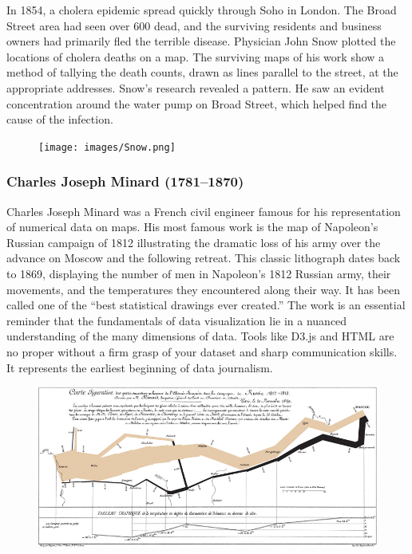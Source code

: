 \documentclass[]{book}
\begin{document}
In 1854, a cholera epidemic spread quickly through Soho in London. The
Broad Street area had seen over 600 dead, and the surviving residents
and business owners had primarily fled the terrible disease. Physician
John Snow plotted the locations of cholera deaths on a map. The
surviving maps of his work show a method of tallying the death counts,
drawn as lines parallel to the street, at the appropriate addresses.
Snow's research revealed a pattern. He saw an evident concentration
around the water pump on Broad Street, which helped find the cause of
the infection.

\begin{figure}
\centering
\texttt{[image: images/Snow.png]}
\caption{}
\end{figure}

\subsubsection{Charles Joseph Minard
(1781--1870)}\label{charles-joseph-minard-17811870}

Charles Joseph Minard was a French civil engineer famous for his
representation of numerical data on maps. His most famous work is the
map of Napoleon's Russian campaign of 1812 illustrating the dramatic
loss of his army over the advance on Moscow and the following retreat.
This classic lithograph dates back to 1869, displaying the number of men
in Napoleon's 1812 Russian army, their movements, and the temperatures
they encountered along their way. It has been called one of the ``best
statistical drawings ever created.'' The work is an essential reminder
that the fundamentals of data visualization lie in a nuanced
understanding of the many dimensions of data. Tools like D3.js and HTML
are no proper without a firm grasp of your dataset and sharp
communication skills. It represents the earliest beginning of data
journalism.

\begin{figure}
\centering
\includegraphics{images/Minard.png}
\caption{}
\end{figure}
\end{document}
